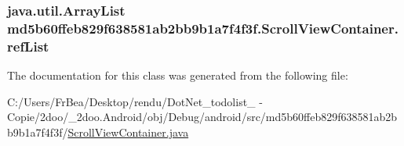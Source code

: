 \hypertarget{classmd5b60ffeb829f638581ab2bb9b1a7f4f3f_1_1_scroll_view_container_84627e927b73a6cc37fd6940f570938a}{
\subsubsection[{refList}]{\setlength{\rightskip}{0pt plus 5cm}java.util.ArrayList {\bf md5b60ffeb829f638581ab2bb9b1a7f4f3f.ScrollViewContainer.refList}}}
\label{classmd5b60ffeb829f638581ab2bb9b1a7f4f3f_1_1_scroll_view_container_84627e927b73a6cc37fd6940f570938a}




The documentation for this class was generated from the following file:\begin{CompactItemize}
\item 
C:/Users/FrBea/Desktop/rendu/DotNet\_\-todolist\_ - Copie/2doo/\_\-2doo.Android/obj/Debug/android/src/md5b60ffeb829f638581ab2bb9b1a7f4f3f/\hyperlink{_scroll_view_container_8java}{ScrollViewContainer.java}\end{CompactItemize}
